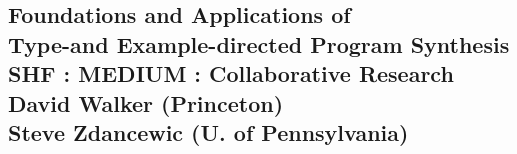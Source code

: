 \documentclass[11pt]{article}
\newcommand{\mytitle}{Foundations and Applications of \\
Type-and Example-directed Program Synthesis}
\begin{document}

%

\newpage
{}
\setcounter{page}{1}

\begin{centering}
\section*{{\LARGE  \mytitle}  \\ 
   {\normalsize SHF : MEDIUM : Collaborative Research} \\
   {\normalsize David Walker (Princeton)} \\ 
   {\normalsize Steve Zdancewic (U. of Pennsylvania)} }
\end{centering}




%


%
%

\end{document}
